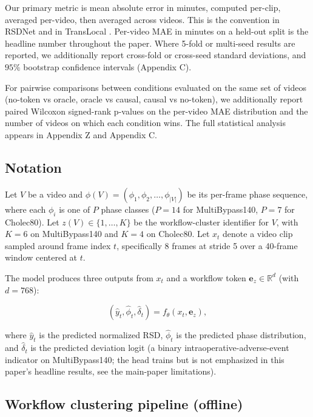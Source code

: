 Our primary metric is mean absolute error in minutes, computed per-clip,
averaged per-video, then averaged across videos. This is the convention
in RSDNet \citep{twinanda2019rsdnet} and in TransLocal \citep{loukas2024translocal}. Per-video MAE in minutes on a held-out split is the headline
number throughout the paper. Where 5-fold or multi-seed results are
reported, we additionally report cross-fold or cross-seed standard
deviations, and \(95\%\) bootstrap confidence intervals (Appendix C).

For pairwise comparisons between conditions evaluated on the same set of
videos (no-token vs oracle, oracle vs causal, causal vs no-token), we
additionally report paired Wilcoxon signed-rank p-values \citep{wilcoxon1945ranking} on the per-video MAE distribution and the number of videos on
which each condition wins. The full statistical analysis appears in
Appendix Z and Appendix C.

\subsection{Notation}\label{notation}

Let \(V\) be a video and
\(\phi(V) = (\phi_1, \phi_2, \ldots, \phi_{|V|})\) be its per-frame
phase sequence, where each \(\phi_i\) is one of \(P\) phase classes
(\(P = 14\) for MultiBypass140, \(P = 7\) for Cholec80). Let
\(z(V) \in \{1, \ldots, K\}\) be the workflow-cluster identifier for
\(V\), with \(K = 6\) on MultiBypass140 and \(K = 4\) on Cholec80. Let
\(x_t\) denote a video clip sampled around frame index \(t\),
specifically 8 frames at stride 5 over a 40-frame window centered at
\(t\).

The model produces three outputs from \(x_t\) and a workflow token
\(\mathbf{e}_z \in
\mathbb{R}^d\) (with \(d = 768\)):

\[
(\hat{y}_t, \hat{\phi}_t, \hat{\delta}_t) = f_\theta(x_t, \mathbf{e}_z),
\]

where \(\hat{y}_t\) is the predicted normalized RSD, \(\hat{\phi}_t\) is
the predicted phase distribution, and \(\hat{\delta}_t\) is the
predicted deviation logit (a binary intraoperative-adverse-event
indicator on MultiBypass140; the head trains but is not emphasized in
this paper's headline results, see the main-paper limitations).

\subsection{Workflow clustering pipeline
(offline)}\label{workflow-clustering-pipeline-offline}

